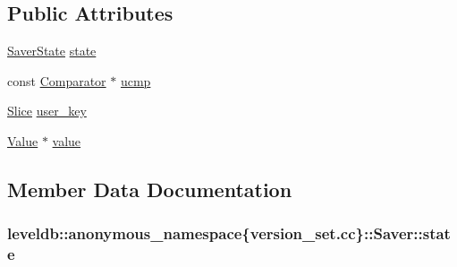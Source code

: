 \subsection*{Public Attributes}
\begin{DoxyCompactItemize}
\item 
\hyperlink{namespaceleveldb_1_1anonymous__namespace_02version__set_8cc_03_aa77f56e7bee115a7e23642d102c7e9fb}{Saver\+State} \hyperlink{structleveldb_1_1anonymous__namespace_02version__set_8cc_03_1_1_saver_a634046d54e916b0e9f51042ffda4c7f2}{state}
\item 
const \hyperlink{structleveldb_1_1_comparator}{Comparator} $\ast$ \hyperlink{structleveldb_1_1anonymous__namespace_02version__set_8cc_03_1_1_saver_aa68e90a0813b95dec9e0dafeaca94388}{ucmp}
\item 
\hyperlink{classleveldb_1_1_slice}{Slice} \hyperlink{structleveldb_1_1anonymous__namespace_02version__set_8cc_03_1_1_saver_a0ee60ba912fe7158e98a81e63d5df580}{user\+\_\+key}
\item 
\hyperlink{classleveldb_1_1_value}{Value} $\ast$ \hyperlink{structleveldb_1_1anonymous__namespace_02version__set_8cc_03_1_1_saver_a97ff634a4d901d4676f1aa450ab10a4d}{value}
\end{DoxyCompactItemize}


\subsection{Member Data Documentation}
\hypertarget{structleveldb_1_1anonymous__namespace_02version__set_8cc_03_1_1_saver_a634046d54e916b0e9f51042ffda4c7f2}{}
\subsubsection[{state}]{ leveldb\+::anonymous\+\_\+namespace\{version\+\_\+set.\+cc\}\+::Saver\+::state}\label{structleveldb_1_1anonymous__namespace_02version__set_8cc_03_1_1_saver_a634046d54e916b0e9f51042ffda4c7f2}
\hypertarget{structleveldb_1_1anonymous__namespace_02version__set_8cc_03_1_1_saver_aa68e90a0813b95dec9e0dafeaca94388}{}
